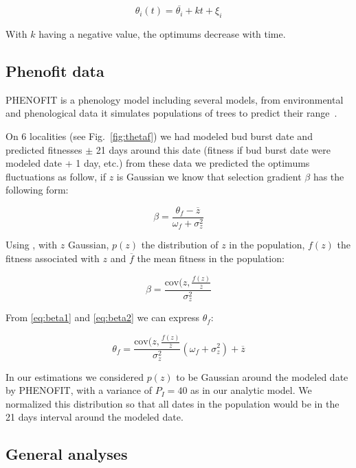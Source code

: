 \begin{equation}
	\theta_i(t) = \overline{\theta_i} + k t + \xi_i
\end{equation}

With $k$ having a negative value, the optimums decrease with time.

\subsection*{Phenofit data}

\textsc{PHENOFIT} is a phenology model including several models, from environmental and phenological data it simulates populations of trees to predict their range~\citep{morin_tree_2008}.

On 6 localities (see Fig.~\ref{fig:thetaf}) we had modeled bud burst date and predicted fitnesses $\pm$ 21 days around this date (fitness if bud burst date were modeled date + 1 day, etc.) from these data we predicted the optimums fluctuations as follow, if $z$ is Gaussian we know that selection gradient $\beta$ has the following form:

\begin{equation}
	\label{eq:beta1}
	\beta = \frac{\theta_f - \overline{z}}{\omega_f + \sigma_z^2}
\end{equation}

Using \citep{lande_measurement_1983}, with $z$ Gaussian, $p(z)$ the distribution of $z$ in the population, $f(z)$ the fitness associated with $z$ and $\overline{f}$ the mean fitness in the population:

\begin{equation}
	\label{eq:beta2}
	\beta = \frac{\text{cov}(z, \frac{f(z)}{\overline{z}}}{\sigma_z^2}
\end{equation}

From \eqref{eq:beta1} and \eqref{eq:beta2} we can express $\theta_f$:

\begin{equation}
	\theta_f = \frac{\text{cov}(z, \frac{f(z)}{\overline{z}}}{\sigma_z^2} (\omega_f + \sigma_z^2) + \overline{z}
\end{equation}

In our estimations we considered $p(z)$ to be Gaussian around the modeled date by \textsc{PHENOFIT}, with a variance of $P_I=40$ as in our analytic model. We normalized this distribution so that all dates in the population would be in the 21 days interval around the modeled date.

\subsection*{General analyses}

